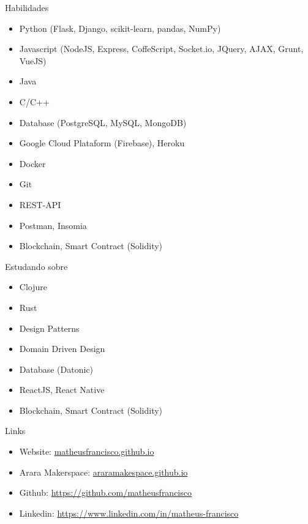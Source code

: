 \documentclass[]{mcdowellcv}
\begin{document}
	
	\begin{cvsection}{Habilidades}
		\begin{cvsubsection}{}{}{}	
			\begin{itemize}
				\item Python (Flask, Django, scikit-learn, pandas, NumPy)
				\item Javascript (NodeJS, Express, CoffeScript, Socket.io, JQuery, AJAX, Grunt, VueJS)
				\item Java				
				\item C/C++
				\item Database (PostgreSQL, MySQL, MongoDB)
				\item Google Cloud Plataform (Firebase), Heroku
				\item Docker
				\item Git
				\item REST-API
				\item Postman, Insomia
				\item Blockchain, Smart Contract (Solidity)
				 
			\end{itemize}
		\end{cvsubsection}
	\end{cvsection}
	\begin{cvsection}{Estudando sobre}
		\begin{cvsubsection}{}{}{}	
			\begin{itemize}
				\item Clojure
				\item Rust
				\item Design Patterns				
				\item Domain Driven Design
				\item Database (Datonic)
				\item ReactJS, React Native
				\item Blockchain, Smart Contract (Solidity)
				 
			\end{itemize}
		\end{cvsubsection}
	\end{cvsection}

	\begin{cvsection}{Links}
		\begin{cvsubsection}{}{}{}	
			\begin{itemize}
				\item Website: \url{matheusfrancisco.github.io}
				\item Arara Makerspace:  \url{araramakespace.github.io}
				\item Github: \url{https://github.com/matheusfrancisco}
				\item Linkedin: \url{https://www.linkedin.com/in/matheus-francisco} 
			\end{itemize}
		\end{cvsubsection}
	\end{cvsection}
	
\end{document}
